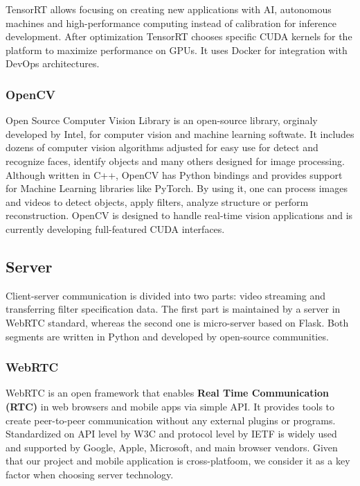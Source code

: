 \documentclass[../Main.tex]{subfiles}
\begin{document}
    TensorRT allows focusing on creating new applications with AI, autonomous machines
    and high-performance computing instead of calibration for inference development.
    After optimization TensorRT chooses specific CUDA kernels for the platform to maximize
    performance on GPUs. It uses Docker for integration with DevOps architectures.
    

    \subsubsection{OpenCV}
    Open Source Computer Vision Library is an open-source library, orginaly developed by Intel, for computer vision and machine learning softwate. It includes dozens of computer vision algorithms adjusted for easy use for detect and recognize faces, identify objects and many others designed for image processing. Although written in C++, OpenCV has Python bindings and provides support for Machine Learning libraries like PyTorch.  By using it, one can process images and videos to detect objects, apply filters, analyze structure or perform reconstruction. OpenCV is designed to handle real-time vision applications and is currently developing full-featured CUDA interfaces.


\newpage
\subsection{Server}
    Client-server communication is divided into two parts: video streaming and transferring filter specification data. The first part is maintained by a server in WebRTC standard, whereas the second one is micro-server based on Flask. Both segments are written in Python and developed by open-source communities.

    \subsubsection{WebRTC}
    WebRTC is an open framework that enables \textbf{Real Time Communication (RTC)} in web browsers and mobile apps via simple API. It provides tools to create peer-to-peer communication without any external plugins or programs. Standardized on API level by W3C 
    and protocol level by IETF 
    is widely used and supported by Google, Apple, Microsoft, and main browser vendors. Given that our project and mobile application is cross-platfoom, we consider it as a key factor when choosing server technology.
    
\end{document}
